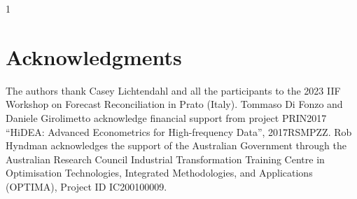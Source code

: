 \documentclass[a4paper,11pt]{article}
\newcommand{\blind}{1}
\theoremstyle{definition}
\begin{document}
\appendix
\setcounter{table}{0}
\renewcommand{\thetable}{\Alph{section}.\arabic{table}}

\blind
{
\section*{Acknowledgments}

\noindent The authors thank Casey Lichtendahl and all the participants to the 2023 IIF Workshop on Forecast Reconciliation in Prato (Italy). Tommaso Di Fonzo and Daniele Girolimetto acknowledge financial support from project PRIN2017 “HiDEA: Advanced Econometrics for High-frequency Data”, 2017RSMPZZ. Rob Hyndman acknowledges the support of the Australian Government through the Australian Research Council Industrial Transformation Training Centre in Optimisation Technologies, Integrated Methodologies, and Applications (OPTIMA), Project ID IC200100009.
} \fi




\end{document}
